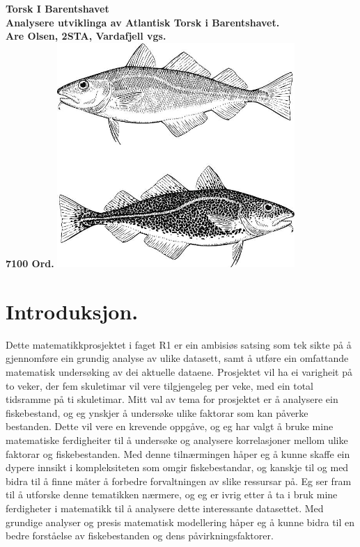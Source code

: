 \documentclass{report}
\begin{document}
\date{\today}
\begin{titlepage}
    \centering
    \vfill
    {\bfseries 
        \Huge Torsk I Barentshavet\\ \Large
        Analysere utviklinga av Atlantisk Torsk i Barentshavet.\\ 
        \vskip2cm
        Are Olsen, 2STA, Vardafjell vgs.\\
        7100 Ord.
    }    
    \vfill
    \includegraphics[width=9cm]{Bileter/Torsk.jpg} %
    \vfill
    \vfill
\end{titlepage}

\tableofcontents

\chapter{Introduksjon.}
Dette matematikkprosjektet i faget R1 er ein ambisiøs satsing som tek sikte på å gjennomføre ein grundig analyse av ulike datasett, samt å utføre ein omfattande matematisk undersøking av dei aktuelle dataene. Prosjektet vil ha ei varigheit på to veker, der fem skuletimar vil vere tilgjengeleg per veke, med ein total tidsramme på ti skuletimar.
Mitt val av tema for prosjektet er å analysere ein fiskebestand, og eg ynskjer å undersøke ulike faktorar som kan påverke bestanden. Dette vil vere en krevende oppgåve, og eg har valgt å bruke mine matematiske ferdigheiter til å undersøke og analysere korrelasjoner mellom ulike faktorar og fiskebestanden. Med denne tilnærmingen håper eg å kunne skaffe ein dypere innsikt i kompleksiteten som omgir fiskebestandar, og kanskje til og med bidra til å finne måter å forbedre forvaltningen av slike ressursar på.
Eg ser fram til å utforske denne tematikken nærmere, og eg er ivrig etter å ta i bruk mine ferdigheter i matematikk til å analysere dette interessante datasettet. Med grundige analyser og presis matematisk modellering håper eg å kunne bidra til en bedre forståelse av fiskebestanden og dens påvirkningsfaktorer.
\end{document}
